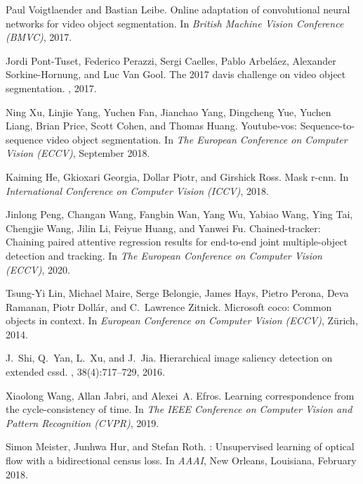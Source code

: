 \documentclass{article}
\begin{document}
{\begin{thebibliography}{10}
Paul Voigtlaender and Bastian Leibe.
\newblock Online adaptation of convolutional neural networks for video object
  segmentation.
\newblock In {\em British Machine Vision Conference (BMVC)}, 2017.

Jordi Pont-Tuset, Federico Perazzi, Sergi Caelles, Pablo Arbel\'aez, Alexander
  Sorkine-Hornung, and Luc {Van Gool}.
\newblock The 2017 davis challenge on video object segmentation.
, 2017.

Ning Xu, Linjie Yang, Yuchen Fan, Jianchao Yang, Dingcheng Yue, Yuchen Liang,
  Brian Price, Scott Cohen, and Thomas Huang.
\newblock Youtube-vos: Sequence-to-sequence video object segmentation.
\newblock In {\em The European Conference on Computer Vision (ECCV)}, September
  2018.

Kaiming He, Gkioxari Georgia, Dollar Piotr, and Girshick Ross.
\newblock Mask r-cnn.
\newblock In {\em International Conference on Computer Vision (ICCV)}, 2018.

Jinlong Peng, Changan Wang, Fangbin Wan, Yang Wu, Yabiao Wang, Ying Tai,
  Chengjie Wang, Jilin Li, Feiyue Huang, and Yanwei Fu.
\newblock Chained-tracker: Chaining paired attentive regression results for
  end-to-end joint multiple-object detection and tracking.
\newblock In {\em The European Conference on Computer Vision (ECCV)}, 2020.

Tsung-Yi Lin, Michael Maire, Serge Belongie, James Hays, Pietro Perona, Deva
  Ramanan, Piotr Dollár, and C.~Lawrence Zitnick.
\newblock Microsoft coco: Common objects in context.
\newblock In {\em European Conference on Computer Vision (ECCV)}, Zürich,
  2014.

J.~{Shi}, Q.~{Yan}, L.~{Xu}, and J.~{Jia}.
\newblock Hierarchical image saliency detection on extended cssd.
, 38(4):717--729, 2016.

Xiaolong Wang, Allan Jabri, and Alexei~A. Efros.
\newblock Learning correspondence from the cycle-consistency of time.
\newblock In {\em The IEEE Conference on Computer Vision and Pattern
  Recognition (CVPR)}, 2019.

Simon Meister, Junhwa Hur, and Stefan Roth.
: Unsupervised learning of optical flow with a bidirectional
  census loss.
\newblock In {\em AAAI}, New Orleans, Louisiana, February 2018.


\end{thebibliography}}
\end{document}
